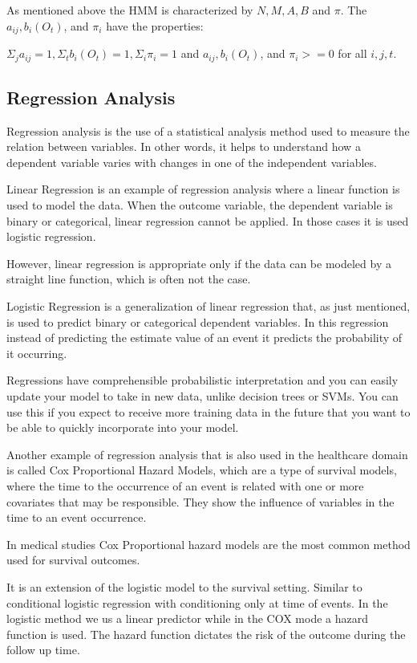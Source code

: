 As mentioned above the HMM is characterized by $N, M, A, B$ and $\pi$. The $a_{ij}, b_i (O_t)$, and $\pi_i$ have the properties:

$ \Sigma_j a_{ij} = 1, \Sigma_t  b_i (O_t) = 1, \Sigma_i \pi_i = 1$ and  $a_{ij}, b_i (O_t)$, and $\pi_i >= 0$ for all $i,j,t$.


\subsection{Regression Analysis}
\label{subsection:regression}

Regression analysis is the use of a statistical analysis method used to measure the relation between variables. In other words, it helps to
 understand how a dependent variable varies with changes in one of the independent variables. 

Linear Regression is an example of regression analysis where a linear function is used to model the data. When the outcome variable,
 the dependent variable is binary or categorical, linear regression cannot be applied. In those cases it is used logistic regression.

 However, linear regression is appropriate only if the data can be modeled by a straight line function, which is often not 
the case.

Logistic Regression is a generalization of linear regression that, as just mentioned, is used to predict binary or categorical dependent
 variables. In this regression instead of predicting the estimate value of an event it predicts the probability of it occurring.

Regressions have comprehensible probabilistic interpretation and you can easily update your model to take in new data, unlike decision trees or SVMs. You can use this if you expect to receive more training data in the future that you want to be able to quickly incorporate into your model.

Another example of regression analysis that is also used in the healthcare domain is called Cox Proportional Hazard Models, which are a type
 of survival models, where the time to the occurrence of an event is related with one or more covariates that may be responsible. They show the 
 influence of variables in the time to an event occurrence.

In medical studies Cox Proportional hazard models are the most common method used for survival outcomes.

It is an extension of the logistic model to the survival setting. Similar to conditional logistic regression with conditioning only at time of 
events. In the logistic method we us a linear predictor while in the COX mode a hazard function is used. The hazard function dictates the risk of
 the outcome during the follow up time.
 
